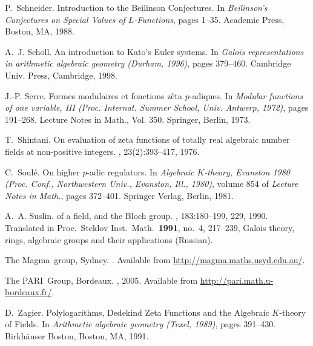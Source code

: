 \documentclass{amsart}
\begin{document}
\begin{thebibliography}{10}
P.~Schneider.
\newblock Introduction to the {B}eilinson {C}onjectures.
\newblock In {\em Beilinson's {C}onjectures on {S}pecial {V}alues of
  $L$-Functions}, pages 1--35. Academic Press, Boston, MA, 1988.

A.~J. Scholl.
\newblock An introduction to {K}ato's {E}uler systems.
\newblock In {\em Galois representations in arithmetic algebraic geometry
  (Durham, 1996)}, pages 379--460. Cambridge Univ. Press, Cambridge, 1998.

J.-P. Serre.
\newblock Formes modulaires et fonctions z\^eta {$p$}-adiques.
\newblock In {\em Modular functions of one variable, III (Proc. Internat.
  Summer School, Univ. Antwerp, 1972)}, pages 191--268. Lecture Notes in Math.,
  Vol. 350. Springer, Berlin, 1973.

T.~Shintani.
\newblock On evaluation of zeta functions of totally real algebraic number
  fields at non-positive integers.
, 23(2):393--417, 1976.

C.~Soul{\'e}.
\newblock On higher {$p$}-adic regulators.
\newblock In {\em Algebraic $K$-theory, Evanston 1980 (Proc. Conf.,
  Northwestern Univ., Evanston, Ill., 1980)}, volume 854 of {\em Lecture Notes
  in Math.}, pages 372--401. Springer Verlag, Berlin, 1981.

A.~A. Suslin.
 of a field, and the {B}loch group.
, 183:180--199, 229, 1990.
\newblock Translated in Proc.\ Steklov Inst.\ Math.\ {\bf 1991}, no.\ 4,
  217--239, Galois theory, rings, algebraic groups and their applications
  (Russian).

{The Magma~group}, Sydney.
.
\newblock Available from \url{http://magma.maths.usyd.edu.au/}.

{The PARI~Group}, Bordeaux.
, 2005.
\newblock Available from \url{http://pari.math.u-bordeaux.fr/}.

D.~Zagier.
\newblock Polylogarithms, {D}edekind {Z}eta {F}unctions and the {A}lgebraic
  ${K}$-theory of {F}ields.
\newblock In {\em Arithmetic algebraic geometry (Texel, 1989)}, pages 391--430.
  Birkh\"auser Boston, Boston, MA, 1991.

\end{thebibliography}
\end{document}
